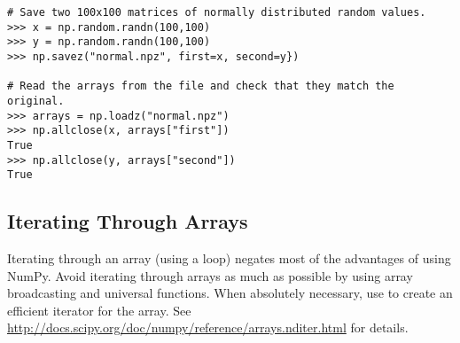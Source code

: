 \begin{lstlisting}
# Save two 100x100 matrices of normally distributed random values.
>>> x = np.random.randn(100,100)
>>> y = np.random.randn(100,100)
>>> np.savez("normal.npz", first=x, second=y})

# Read the arrays from the file and check that they match the original.
>>> arrays = np.loadz("normal.npz")
>>> np.allclose(x, arrays["first"])
True
>>> np.allclose(y, arrays["second"])
True
\end{lstlisting}

\subsection*{Iterating Through Arrays} %

Iterating through an array (using a  loop) negates most of the advantages of using NumPy.
Avoid iterating through arrays as much as possible by using array broadcasting and universal functions.
When absolutely necessary, use  to create an efficient iterator for the array.
See \url{http://docs.scipy.org/doc/numpy/reference/arrays.nditer.html} for details.

